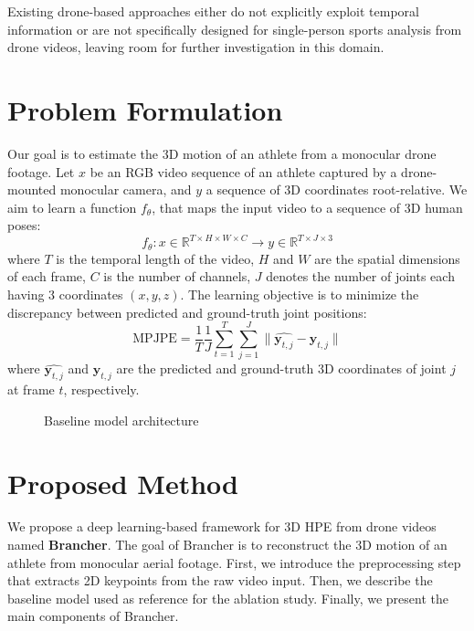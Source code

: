 \documentclass[11pt,a4paper,twocolumn]{article}
\newcommand{\usesvg}[3]{
    \IfFileExists{#1}
    {}
    {} 
}
\newcommand{\useSvgWithCaption}[5][]{
    \begin{figure}[t!]
        \centering
        \usesvg{#2}{#3}{#4}
        \caption{#5}
        \ifthenelse{\equal{#1}{}}{}{%
            \label{#1}%
        }%
    \end{figure}
}
\begin{document}
Existing drone-based approaches either do not explicitly exploit temporal information or are not specifically designed for single-person sports analysis from drone videos, leaving room for further investigation in this domain.


\section{Problem Formulation}
Our goal is to estimate the 3D motion of an athlete from a monocular drone footage. Let $x$ be an RGB video sequence of an athlete captured by a drone-mounted monocular camera, and $y$ a sequence of 3D coordinates root-relative. We aim to 
learn a function $f_\theta$, 
that maps the input video to a sequence of 3D human poses:
\begin{equation}
    f_{\theta}: x \in \mathbb{R}^{T \times H \times W \times C} \rightarrow y \in \mathbb{R}^{T \times J \times 3}
\end{equation}
where $T$ is the temporal length of the video, $H$ and $W$ are the spatial dimensions of each frame, $C$ is the number of channels, $J$ denotes the number of joints each having 3 coordinates $(x,y,z)$.
The learning objective is to minimize the discrepancy between predicted and ground-truth joint positions:
\begin{equation}
    \text{MPJPE} = \frac{1}{T} \frac{1}{J} \sum_{t=1}^{T} \sum_{j=1}^{J} \| \hat{\mathbf{y}_{t,j}} - \mathbf{y}_{t,j} \|
\end{equation}
\label{eq:mpjpe}
where $\hat{\mathbf{y}_{t,j}}$ and $\mathbf{y}_{t,j}$ are the predicted and ground-truth 3D coordinates of joint $j$ at frame $t$, respectively.

\useSvgWithCaption[fig:baseline]{Images/baseline.svg}{1.0}{1.0}{Baseline model architecture}
\section{Proposed Method}
We propose a deep learning-based framework for 3D HPE from drone videos named \textbf{Brancher}. The goal of Brancher is to reconstruct the 3D motion of an athlete from monocular aerial 
footage.
First, we introduce the preprocessing step that extracts 2D keypoints from the raw video input. Then, we describe the baseline model used as reference for the ablation study. Finally, we present the main components of Brancher.
\end{document}
